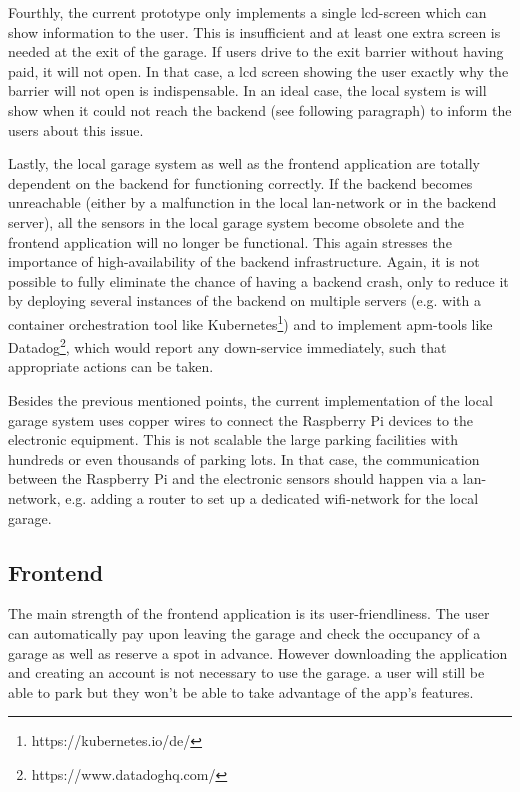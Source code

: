 \ind Fourthly, the current prototype only implements a single \ac{lcd}-screen which can show information to the user. This is insufficient and at least one extra screen is needed at the exit of the garage. If users drive to the exit barrier without having paid, it will not open. In that case, a \ac{lcd} screen showing the user exactly why the barrier will not open is indispensable. In an ideal case, the local system is will show when it could not reach the backend (see following paragraph) to inform the users about this issue.

\ind Lastly, the local garage system as well as the frontend application are totally dependent on the backend for functioning correctly. If the backend becomes unreachable (either by a malfunction in the local \ac{lan}-network or in the backend server), all the sensors in the local garage system become obsolete and the frontend application will no longer be functional. This again stresses the importance of high-availability of the backend infrastructure. Again, it is not possible to fully eliminate the chance of having a backend crash, only to reduce it by deploying several instances of the backend on multiple servers (e.g. with a container orchestration tool like Kubernetes\footnote{https://kubernetes.io/de/}) and to implement \ac{apm}-tools like Datadog\footnote{https://www.datadoghq.com/}, which would report any down-service immediately, such that appropriate actions can be taken.

\ind Besides the previous mentioned points, the current implementation of the local garage system uses copper wires to connect the Raspberry Pi devices to the electronic equipment. This is not scalable the large parking facilities with hundreds or even thousands of parking lots. In that case, the communication between the Raspberry Pi and the electronic sensors should happen via a \ac{lan}-network, e.g. adding a router to set up a dedicated \ac{wifi}-network for the local garage.

\subsection{Frontend}
The main strength of the frontend application is its user-friendliness. The user can automatically pay upon leaving the garage and check the occupancy of a garage as well as reserve a spot in advance. However downloading the application and creating an account is not necessary to use the garage. a user will still be able to park but they won't be able to take advantage of the app's features.

